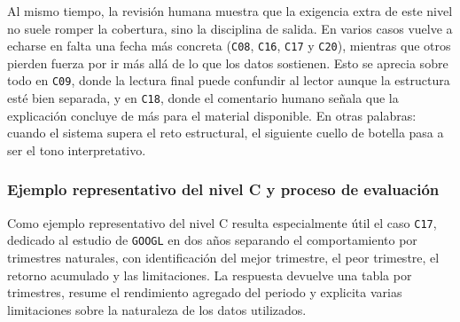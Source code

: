 Al mismo tiempo, la revisi\'on humana muestra que la exigencia extra de este nivel no suele romper la cobertura, sino la 
disciplina de salida. En varios casos vuelve a echarse en falta una fecha m\'as concreta (\texttt{C08}, \texttt{C16}, 
\texttt{C17} y \texttt{C20}), mientras que otros pierden fuerza por ir m\'as all\'a de lo que los datos sostienen. Esto se 
aprecia sobre todo en \texttt{C09}, donde la lectura final puede confundir al lector aunque la estructura est\'e bien 
separada, y en \texttt{C18}, donde el comentario humano se\~nala que la explicaci\'on concluye de m\'as para el material 
disponible. En otras palabras: cuando el sistema supera el reto estructural, el siguiente cuello de botella pasa a ser el 
tono interpretativo.

\subsubsection{Ejemplo representativo del nivel C y proceso de evaluaci\'on}

Como ejemplo representativo del nivel C resulta especialmente \'util el caso \texttt{C17}, dedicado al estudio de 
\texttt{GOOGL} en dos a\~nos separando el comportamiento por trimestres naturales, con identificaci\'on del mejor 
trimestre, el peor trimestre, el retorno acumulado y las limitaciones. La respuesta devuelve una tabla por trimestres, 
resume el rendimiento agregado del periodo y explicita varias limitaciones sobre la naturaleza de los datos utilizados.

